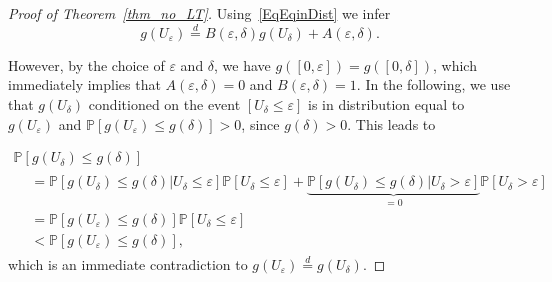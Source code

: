 \documentclass[10pt,a4paper]{amsart}
\numberwithin{equation}{section}
\newcommand{\bbP}{\mathbb{P}}
\theoremstyle{definition}
\begin{document}
\begin{proof}[Proof of Theorem~\ref{thm_no_LT}]
Using~\eqref{EqEqinDist} we infer
\begin{equation*}
g(U_{\varepsilon}) \stackrel{d}{=} B(\varepsilon, \delta) g(U_{\delta}) + A(\varepsilon, \delta).
\end{equation*}

However, by the choice of $\varepsilon$ and $\delta$, we have $g([0, \varepsilon]) = g([0, \delta])$, which immediately implies that $A(\varepsilon, \delta)=0$ and $B(\varepsilon, \delta)=1$. In the following, we use that $g(U_{\delta})$ conditioned on the event $ \left[U_{\delta} \leq \varepsilon \right] $ is in distribution equal to $ g(U_{\varepsilon}) $ and $\bbP \left[g(U_{\varepsilon}) \leq g(\delta) \right] > 0$, since $g(\delta)>0$. This leads to

\begin{multline*}
\bbP\left[g(U_{\delta}) \leq g(\delta)\right]
\\
\begin{aligned}
&= \bbP\left[g(U_{\delta}) \leq g(\delta) | U_{\delta} \leq \varepsilon \right] \bbP \left[U_{\delta} \leq \varepsilon \right] + \underbrace{\bbP\left[g(U_{\delta}) \leq g(\delta) | U_{\delta} > \varepsilon \right]}_{=0} \bbP \left[U_{\delta} > \varepsilon \right] \\
&=\bbP \left[g(U_{\varepsilon}) \leq g(\delta) \right] \bbP \left[U_{\delta} \leq \varepsilon \right] \\
&<\bbP \left[g(U_{\varepsilon}) \leq g(\delta) \right],
\end{aligned}
\end{multline*}
which is an immediate contradiction to $g(U_\varepsilon) \stackrel{d}{=} g(U_\delta)$.
\end{proof}
\end{document}
